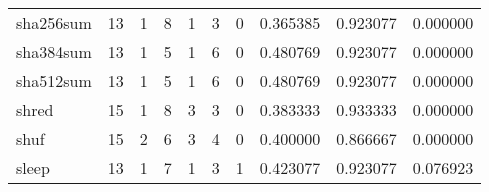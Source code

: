 \begin{tabular}{lrrrrrrrrr}
sha256sum &                                       13 &                                                  1 &                                                  8 &                                                  1 &                                                  3 &                                                  0 &                                           0.365385 &                               0.923077 &                             0.000000 \\
sha384sum &                                       13 &                                                  1 &                                                  5 &                                                  1 &                                                  6 &                                                  0 &                                           0.480769 &                               0.923077 &                             0.000000 \\
sha512sum &                                       13 &                                                  1 &                                                  5 &                                                  1 &                                                  6 &                                                  0 &                                           0.480769 &                               0.923077 &                             0.000000 \\
shred     &                                       15 &                                                  1 &                                                  8 &                                                  3 &                                                  3 &                                                  0 &                                           0.383333 &                               0.933333 &                             0.000000 \\
shuf      &                                       15 &                                                  2 &                                                  6 &                                                  3 &                                                  4 &                                                  0 &                                           0.400000 &                               0.866667 &                             0.000000 \\
sleep     &                                       13 &                                                  1 &                                                  7 &                                                  1 &                                                  3 &                                                  1 &                                           0.423077 &                               0.923077 &                             0.076923 \\

\end{tabular}
